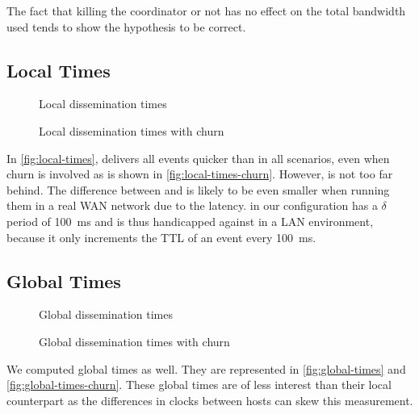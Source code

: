 The fact that killing the coordinator or not has no effect on the total bandwidth used tends to show the hypothesis to be correct.
\subsection{Local Times}
\label{sub:local-times}
\begin{figure}[h]
	\centering
	
	\vspace{-2mm} 
	\caption{Local dissemination times}
	\vspace{-2mm}
	\label{fig:local-times} 
\end{figure}

\begin{figure}[h]
	\centering
	
	\vspace{-2mm} 
	\caption{Local dissemination times with churn}
	\vspace{-2mm} 
	\label{fig:local-times-churn} 
\end{figure}
In \autoref{fig:local-times}, \jgroups delivers all events quicker than \epto in all scenarios, even when churn is involved as is shown in \autoref{fig:local-times-churn}. However, \epto is not too far behind. The difference between \epto and \jgroups is likely to be even smaller when running them in a real WAN network due to the latency. \epto in our configuration has a $\delta$ period of \SI{100}{\milli\second} and is thus handicapped against \jgroups in a LAN environment, because it only increments the TTL of an event every \SI{100}{\milli\second}.
\newpage
\subsection{Global Times}
\begin{figure}[h]
	\centering
	
	\vspace{-2mm} 
	\caption{Global dissemination times}
	\vspace{-2mm}
	\label{fig:global-times}  
\end{figure}

\begin{figure}[h]
	\centering
	
	\vspace{-2mm} 
	\caption{Global dissemination times with churn}
	\vspace{-2mm} 
	\label{fig:global-times-churn} 
\end{figure}
We computed global times as well. They are represented in \autoref{fig:global-times} and \autoref{fig:global-times-churn}. These global times are of less interest than their local counterpart as the differences in clocks between hosts can skew this measurement.

